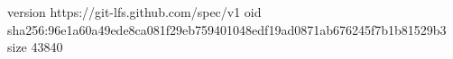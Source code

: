 version https://git-lfs.github.com/spec/v1
oid sha256:96e1a60a49ede8ca081f29eb759401048edf19ad0871ab676245f7b1b81529b3
size 43840

